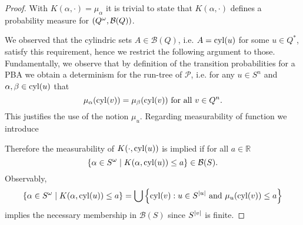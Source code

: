 \begin{proof}
  With $K(\alpha,\cdot) = \mu_{\alpha}$ it is trivial to state that 
  $K(\alpha,\cdot)$ defines a probability measure for 
  $\left(Q^{\omega},\mathcal{B}(Q)\right)$.

  We observed that the cylindric sets 
  $A\in\mathcal{B}(Q)$, i.e. $A = \operatorname{cyl}(u)$ for some $u\in Q^{*}$, satisfy 
  this requirement, hence we restrict the following argument to those.
  Fundamentally, we observe that by definition of the transition 
  probabilities for a \ac{PBA} we obtain a determinism for the run-tree of 
  $\mathcal{P}$, i.e. for any $u\in S^{n}$ and $\alpha, \beta\in\operatorname{cyl}(u)$ that
  \begin{equation*}
    \mu_{\alpha}(\operatorname{cyl}(v)) = \mu_{\beta}(\operatorname{cyl}(v))\text{ for all }v\in Q^{n}.
  \end{equation*}
  This justifies the use of the notion $\mu_{u}$.  Regarding measurability of 
  function we introduce

  Therefore the measurability of $K(\cdot, \operatorname{cyl}(u))$ is implied if for all 
  $a\in\mathbb{R}$
  \begin{equation*}
    \left\{\alpha\in S^{\omega}\mid K(\alpha, \operatorname{cyl}(u))\leq a\right\}\in\mathcal{B}(S).
  \end{equation*}
  Observably,
  \begin{equation*}
    \left\{\alpha\in S^{\omega}\mid K(\alpha, \operatorname{cyl}(u))\leq a\right\} = 
      \bigcup\left\{
        \operatorname{cyl}(v):u\in S^{\left\vert{u}\right\vert}\text{ and }\mu_{u}(\operatorname{cyl}(v))\leq a
      \right\}
  \end{equation*}
  implies the necessary membership in $\mathcal{B}(S)$ since $S^{\left\vert{v}\right\vert}$ 
  is finite.
\end{proof}

